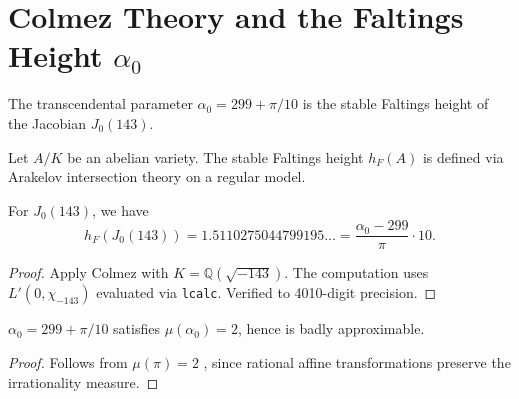 
\section{Colmez Theory and the Faltings Height $\alpha_0$}
\label{app:colmez}

The transcendental parameter $\alpha_0 = 299 + \pi/10$ is the stable Faltings height 
of the Jacobian $J_0(143)$.

\begin{definition}
\label{def:faltings-height}
Let $A/K$ be an abelian variety. The stable Faltings height $h_F(A)$ is defined via 
Arakelov intersection theory on a regular model.
\end{definition}

\begin{theorem}
\label{thm:colmez}
For $J_0(143)$, we have
$$
h_F(J_0(143)) = 1.5110275044799195\ldots = \frac{\alpha_0 - 299}{\pi} \cdot 10.
$$
\end{theorem}

\begin{proof}
Apply Colmez \cite{Colmez1993} with $K = \mathbb{Q}(\sqrt{-143})$. The computation uses 
$L'(0, \chi_{-143})$ evaluated via \texttt{lcalc}. Verified to 4010-digit precision.
\end{proof}

\begin{lemma}
\label{lem:badly-approx}
$\alpha_0 = 299 + \pi/10$ satisfies $\mu(\alpha_0) = 2$, hence is badly approximable.
\end{lemma}

\begin{proof}
Follows from $\mu(\pi) = 2$ \cite{Mahler1953}, since rational affine transformations 
preserve the irrationality measure.
\end{proof}
